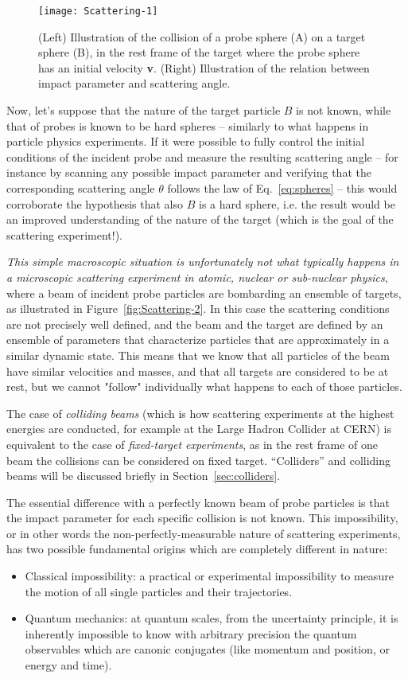 \begin{figure}
    \texttt{[image: Scattering-1]}
    \caption{(Left) Illustration of the collision of a probe sphere (A) on a target sphere (B), in the rest frame of the target where the probe sphere has an initial velocity {\bf v}. (Right) Illustration of the relation between impact parameter and scattering angle.}
    \label{fig:spheres}
\end{figure}{}

Now, let's suppose that the nature of the target particle $B$ is not known, while that of probes is known to be hard spheres -- similarly to what happens in particle physics experiments. If it were possible to fully control the initial conditions of the incident probe and measure the resulting scattering angle -- for instance by scanning any possible impact parameter and verifying that the corresponding scattering angle $\theta$ follows the law of Eq.~\eqref{eq:spheres} -- this would corroborate the hypothesis that also $B$ is a hard sphere, i.e. the result would be an improved understanding of the nature of the target (which is the goal of the scattering experiment!).

{\it This simple macroscopic situation is unfortunately not what typically happens in a microscopic scattering experiment in atomic, nuclear or sub-nuclear physics}, where a beam of incident probe particles are bombarding an ensemble of targets, as illustrated in Figure~\ref{fig:Scattering-2}. In this case the scattering conditions are not precisely well defined, and the beam and the target are defined by an ensemble of parameters that characterize particles that are approximately in a similar dynamic state. This means that we know that all particles of the beam have similar velocities and masses, and that all targets are considered to be at rest, but we cannot "follow" individually what happens to each of those particles.

The case of \emph{colliding beams} (which is how scattering experiments at the highest energies are conducted, for example at the Large Hadron Collider at CERN) is equivalent to the case of \emph{fixed-target experiments}, as in the rest frame of one beam the collisions can be considered on fixed target. ``Colliders'' and colliding beams will be discussed briefly in Section~\ref{sec:colliders}.

The essential difference with a perfectly known beam of probe particles is that the impact parameter for each specific collision is not known. This impossibility, or in other words the non-perfectly-measurable nature of scattering experiments, has two possible fundamental origins which are completely different in nature:
\begin{itemize}
    \item Classical impossibility: a practical or experimental impossibility to measure the motion of all single particles and their trajectories.
    \item Quantum mechanics: at quantum scales, from the uncertainty principle, it is inherently impossible to  know with arbitrary precision the quantum observables which are canonic conjugates (like momentum and position, or energy and time).  
\end{itemize}

